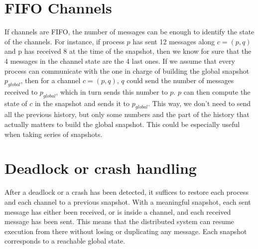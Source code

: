 \documentclass{article}
\begin{document}
\section{FIFO Channels}

If channels are FIFO, the number of messages can be enough to identify the state of the channels.
For instance, if process $p$ has sent 12 messages along $c=(p,q)$ and p has received 8 at the time of the snapshot, then we know for sure that the 4 messages in the channel state are the 4 last ones.
If we assume that every process can communicate with the one in charge of building the global snapshot $p_{global}$, then for a channel $c=(p,q)$, $q$ could send the number of messages received to $p_{global}$, which in turn sends this number to $p$. $p$ can then compute the state of $c$ in the snapshot and sends it to $p_{global}$.
This way, we don't need to send all the previous history, but only some numbers and the part of the history that actually matters to build the global snapshot. This could be especially useful when taking series of snapshots.

\section{Deadlock or crash handling}

After a deadlock or a crash has been detected, it suffices to restore each process and each channel to a previous snapshot.
With a meaningful snapshot, each sent message has either been received, or is inside a channel, and each received message has been sent. This means that the distributed system can resume execution from there without losing or duplicating any message.
Each snapshot corresponds to a reachable global state.
\end{document}
